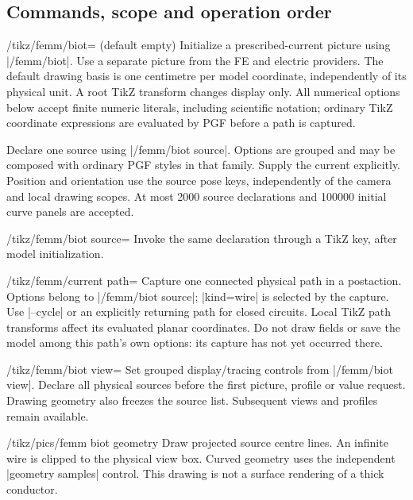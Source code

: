 \subsection{Commands, scope and operation order}
\begin{key}{/tikz/femm/biot= (default empty)}
Initialize a prescribed-current picture using |/femm/biot|. Use a separate picture
from the FE and electric providers. The default drawing basis is one centimetre
per model coordinate, independently of its physical unit. A root TikZ transform
changes display only. All numerical options below accept finite numeric literals,
including scientific notation; ordinary TikZ coordinate expressions are evaluated
by PGF before a path is captured.
\end{key}
\begin{command}{\femmbiotsource{}}
Declare one source using |/femm/biot source|. Options are grouped and may be
composed with ordinary PGF styles in that family. Supply the current explicitly.
Position and orientation use the source pose keys, independently of the camera
and local drawing scopes. At most 2000 source declarations and 100000 initial curve panels are accepted.
\end{command}
\begin{key}{/tikz/femm/biot source=}
Invoke the same declaration through a TikZ key, after model initialization.
\end{key}
\begin{key}{/tikz/femm/current path=}
Capture one connected physical path in a postaction. Options belong to
|/femm/biot source|; |kind=wire| is selected by the capture. Use |--cycle| or an
explicitly returning path for closed circuits. Local TikZ path transforms affect
its evaluated planar coordinates. Do not draw fields or save the model among
this path's own options: its capture has not yet occurred there.
\end{key}
\begin{key}{/tikz/femm/biot view=}
Set grouped display/tracing controls from |/femm/biot view|. Declare all physical
sources before the first picture, profile or value request. Drawing geometry
also freezes the source list. Subsequent views and profiles remain available.
\end{key}
\begin{key}{/tikz/pics/femm biot geometry}
Draw projected source centre lines. An infinite wire is clipped to the physical
view box. Curved geometry uses the independent |geometry samples| control.
This drawing is not a surface rendering of a thick conductor.
\end{key}
